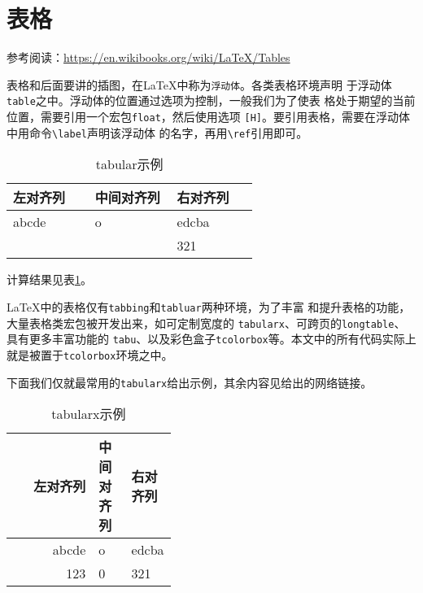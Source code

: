 \section{表格}
参考阅读：\url{https://en.wikibooks.org/wiki/LaTeX/Tables}

表格和后面要讲的插图，在\LaTeX{}中称为\texttt{浮动体}。各类表格环境声明
于浮动体\texttt{table}之中。浮动体的位置通过选项为控制，一般我们为了使表
格处于期望的当前位置，需要引用一个宏包\texttt{float}，然后使用选项
\texttt{[H]}。要引用表格，需要在浮动体中用命令\verb!\label!声明该浮动体
的名字，再用\verb!\ref!引用即可。

\begin{codeout}
\begin{table}[H]
\caption{tabular示例}
\label{table:first}
\begin{center}
\begin{tabular}{>{\raggedleft}p{0.2\linewidth}
  >{\centering}p{0.2\linewidth} p{0.2\linewidth}}
  \toprule
  左对齐列 & 中间对齐列 & 右对齐列 \\
  \hline
  abcde    & o          & edcba    \\
  123      & 0          & 321      \\
\bottomrule
\end{tabular}
\end{center}
\end{table}

计算结果见表\ref{table:first}。

\end{codeout}

\LaTeX{}中的表格仅有\texttt{tabbing}和\texttt{tabluar}两种环境，为了丰富
和提升表格的功能，大量表格类宏包被开发出来，如可定制宽度的
\texttt{tabularx}、可跨页的\texttt{longtable}、具有更多丰富功能的
\texttt{tabu}、以及彩色盒子\texttt{tcolorbox}等。本文中的所有代码实际上
就是被置于\texttt{tcolorbox}环境之中。

下面我们仅就最常用的\texttt{tabularx}给出示例，其余内容见给出的网络链接。

\begin{codeout}
\begin{table}[H]
\caption{tabularx示例}
\begin{center}
\begin{tabularx}{0.7\linewidth}{rp{0.2\linewidth}p{0.2\linewidth}}
  \toprule
  左对齐列 & 中间对齐列 & 右对齐列 \\
  \midrule
  abcde & o & edcba \\
  123 & 0 & 321 \\
  \bottomrule
\end{tabularx}
\end{center}
\end{table}
\end{codeout}

